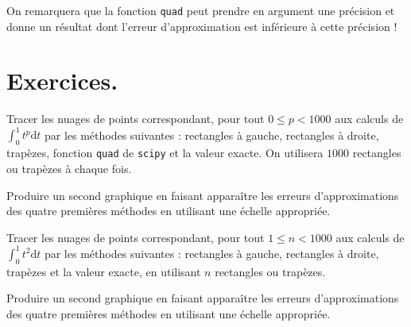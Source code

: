 On remarquera que la fonction \texttt{quad} peut prendre en argument une précision et donne un résultat dont l'erreur d'approximation est inférieure à cette précision ! 

\section{Exercices.}

  Tracer les nuages de points correspondant, pour tout $0\leq p < 1000$ aux calculs de $\displaystyle\int_0^1 t^p \mathrm{d}t$ par les méthodes suivantes : rectangles à gauche, rectangles à droite, trapèzes, fonction \texttt{quad} de \texttt{scipy} et la valeur exacte.
  On utilisera $1000$ rectangles ou trapèzes à chaque fois. 
  
  Produire un second graphique en faisant apparaître les erreurs d'approximations des quatre premières méthodes en utilisant une échelle appropriée. 

  Tracer les nuages de points correspondant, pour tout $1\leq n < 1000$ aux calculs de $\displaystyle\int_0^1 t^2 \mathrm{d}t$ par les méthodes suivantes : rectangles à gauche, rectangles à droite, trapèzes  et la valeur exacte, en utilisant $n$ rectangles ou trapèzes.
  
  Produire un second graphique en faisant apparaître les erreurs d'approximations des quatre premières méthodes en utilisant une échelle appropriée. 
